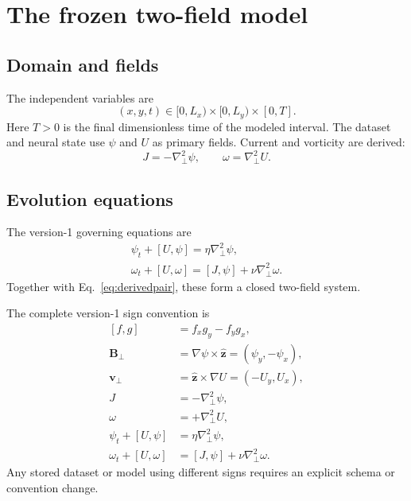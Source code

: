 \documentclass[11pt]{article}
\newcommand{\vect}[1]{\bm{#1}}
\newcommand{\bracket}[2]{\left[#1,#2\right]}
\newcommand{\Lap}{\nabla_{\!\perp}^{2}}
\begin{document}
\section{The frozen two-field model}
\label{sec:finalsystem}

\subsection{Domain and fields}

The independent variables are
\begin{equation}
(x,y,t)\in[0,L_x)\times[0,L_y)\times[0,T].
\end{equation}
Here $T>0$ is the final dimensionless time of the modeled interval. The dataset and neural state use $\psi$ and $U$ as primary fields. Current and vorticity are derived:
\begin{equation}
J=-\Lap\psi,
\qquad
\omega=\Lap U.
\label{eq:derivedpair}
\end{equation}

\subsection{Evolution equations}

The version-1 governing equations are
\begin{align}
\boxed{
\psi_t+\bracket{U}{\psi}=\eta\Lap\psi,}
\label{eq:psi_final}\\[0.4em]
\boxed{
\omega_t+\bracket{U}{\omega}
=\bracket{J}{\psi}+\nu\Lap\omega.}
\label{eq:omega_final}
\end{align}
Together with Eq.~\eqref{eq:derivedpair}, these form a closed two-field system.

\begin{conventionbox}
The complete version-1 sign convention is
\begin{align*}
\bracket{f}{g}&=f_xg_y-f_yg_x,\\
\vect{B}_\perp&=\nabla\psi\times\widehat{\vect{z}}=(\psi_y,-\psi_x),\\
\vect{v}_\perp&=\widehat{\vect{z}}\times\nabla U=(-U_y,U_x),\\
J&=-\Lap\psi,\\
\omega&=+\Lap U,\\
\psi_t+[U,\psi]&=\eta\Lap\psi,\\
\omega_t+[U,\omega]&=[J,\psi]+\nu\Lap\omega.
\end{align*}
Any stored dataset or model using different signs requires an explicit schema or convention change.
\end{conventionbox}
\end{document}
